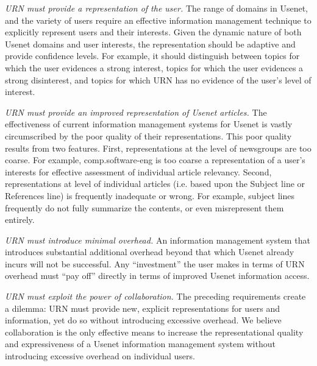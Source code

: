 \begin {itemizenoindent}

\item {\em URN must provide a representation of the user.} The range of
  domains in Usenet, and the variety of users require an effective information
  management technique to explicitly represent users and their interests.
  Given the dynamic nature of both Usenet domains and user interests, the
  representation should be adaptive and provide confidence levels. For example,
  it should distinguish between topics for which the user evidences a strong
  interest, topics for which the user evidences a strong disinterest, and topics
  for which URN has no evidence of the user's level of interest.
  
\item {\em URN must provide an improved representation of Usenet
  articles.} The effectiveness of current information management systems
  for Usenet is vastly circumscribed by the poor quality of their
  representations. This poor quality results from two features. First,
  representations at the level of newsgroups are too coarse. For example,
  comp.software-eng is too coarse a representation of a user's interests for
  effective assessment of individual article relevancy.  Second,
  representations at level of individual articles (i.e. based upon the
  Subject line or References line) is frequently inadequate or wrong.  For
  example, subject lines frequently do not fully summarize the contents, or
  even misrepresent them entirely.
  
\item {\em URN must introduce minimal overhead.} An information
  management system that introduces substantial additional overhead beyond
  that which Usenet already incurs will not be successful.  Any
  ``investment'' the user makes in terms of URN overhead must ``pay off''
  directly in terms of improved Usenet information access.
  
\item {\em URN must exploit the power of collaboration.} The preceding
  requirements create a dilemma: URN must provide new, explicit
  representations for users and information, yet do so without introducing
  excessive overhead.  We believe collaboration is the only effective means
  to increase the representational quality and expressiveness of a Usenet
  information management system without introducing excessive overhead on
  individual users.
\end {itemizenoindent}


